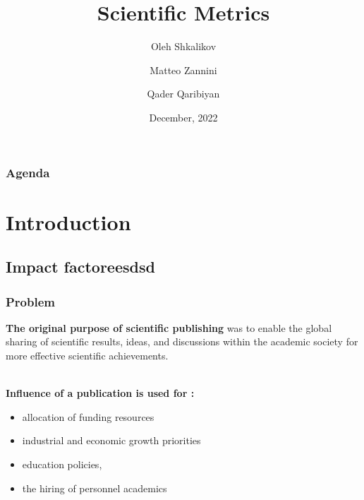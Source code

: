 \documentclass{beamer}
\title[Scientific metrics]{Scientific Metrics}
\author[O. Shkalikov \and M. Zannini \and Q.Qaribiyan]
{Oleh Shkalikov \and Matteo Zannini \and Qader Qaribiyan}
\institute[]{TU Dresden, Computer Science Faculty}
\date{December, 2022}
\begin{document}
\frame{\titlepage}

\begin{frame}
    \frametitle{Agenda}
    \tableofcontents
\end{frame}

\section{Introduction}

\subsection{Impact factoreesdsd}
\begin{frame}

    \frametitle{Problem}

    \textbf{The original purpose of scientific publishing} was to enable the global sharing of scientific results, ideas, and discussions within the academic society for more effective scientific achievements.\\~\

     \textbf{Influence of a publication is used for :}

\begin{itemize}
   \item allocation of funding resources
   \item industrial and economic growth priorities
   \item  education policies, 
   \item  the hiring of personnel academics
\end{itemize}

\end{frame}
\end{document}
